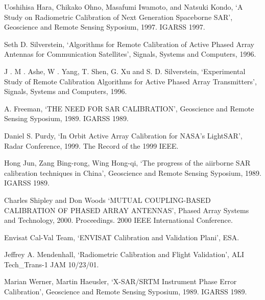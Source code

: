 \documentclass[a4paper,10pt]{article}
\begin{document}
\begin{enumerate}[ {[}1{]} ]
		\item \label{ppr:rev1} Uoshihisa Hara, Chikako Ohno, Masafumi Iwamoto, 
		and Natsuki Kondo, \enquote*{A Study on Radiometric Calibration of Next
		Generation Spaceborne SAR}, Geoscience and Remote Sensing Syposium, 
		1997. IGARSS 1997.

		\item \label{ppr:ext1} Seth D. Silverstein, \enquote*{Algorithms for 
		Remote Calibration of Active Phased Array Antennas for Communication 
		Satellites}, Signals, Systems and Computers, 1996.
		
		\item \label{ppr:ext2} J . M . Ashe, W . Yang, T. Shen, G. Xu and S. D.
		Silverstein, \enquote*{Experimental Study of Remote Calibration 
		Algorithms for Active Phased Array Transmitters}, Signals, Systems and
		Computers, 1996.
		
		\item A. Freeman, \enquote*{THE NEED FOR SAR CALIBRATION}, Geoscience
		and Remote Sensing Syposium, 1989. IGARSS 1989. 
		
		\item \label{ppr:ext3} Daniel S. Purdy, \enquote*{In Orbit Active Array
		Calibration for NASA’s LightSAR}, Radar Conference, 1999. The Record of
		the 1999 IEEE.
		
		\item \label{ppr:punc-ext1} Hong Jun, Zang Bing-rong, Wing Hong-qi, 
		\enquote*{The progress of the aiirborne SAR calibration techniques in 
		China}, Geoscience and Remote Sensing Syposium, 1989. IGARSS 1989.

		\item \label{ppr:mutual2} Charles Shipley and Don Woods \enquote*{MUTUAL
		COUPLING-BASED CALIBRATION OF PHASED ARRAY ANTENNAS}, Phased Array 
		Systems and Technology, 2000. Proceedings. 2000 IEEE International 
		Conference.
		
		\item Envisat Cal-Val Team, \enquote*{ENVISAT Calibration and Validation
		Plani}, ESA.
		
		\item \label{ppr:rad4} Jeffrey A. Mendenhall, \enquote*{Radiometric 
		Calibration and Flight Validation}, ALI Tech\_Trans-1 JAM 10/23/01.

		
		\item Marian Werner, Martin Haeusler, \enquote*{X-SAR/SRTM Instrument 
		Phase Error Calibration}, Geoscience and Remote Sensing Syposium, 1989.
		IGARSS 1989.
		

\end{enumerate}
\end{document}
